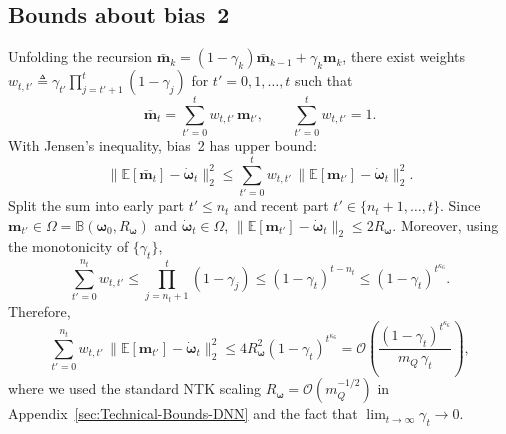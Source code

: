 \documentclass{IEEEtran}
\begin{document}
\subsection{Bounds about bias~2}
Unfolding the recursion $\bar{\boldsymbol{m}}_{k}=(1-\gamma_{k})\bar{\boldsymbol{m}}_{k-1}+\gamma_{k}\boldsymbol{m}_{k}$, there exist weights
$w_{t,t'}\triangleq \gamma_{t'}\prod_{j=t'+1}^{t}(1-\gamma_j)$ for $t'=0,1,\ldots,t$ such that
\begin{equation}
\bar{\boldsymbol{m}}_{t}=\sum_{t'=0}^{t} w_{t,t'}\,\boldsymbol{m}_{t'},\qquad \sum_{t'=0}^{t} w_{t,t'}=1.
\label{eq:appB_bar_m_weights}
\end{equation}
With Jensen's inequality, bias~2 has upper bound: 
\begin{equation}
\bigl\|\mathbb{E}[\bar{\boldsymbol{m}}_{t}]-\dot{\boldsymbol{\omega}}_{t}\bigr\|_2^2
\le \sum_{t'=0}^{t} w_{t,t'}\,\bigl\|\mathbb{E}[\boldsymbol{m}_{t'}]-\dot{\boldsymbol{\omega}}_{t}\bigr\|_2^2.
\label{eq:appB_jensen_bias2}
\end{equation}
Split the sum into early part $t'\le n_t$ and recent part $t'\in\{n_t+1,\ldots,t\}$. Since $\boldsymbol{m}_{t'}\in\Omega=\mathbb{B}(\boldsymbol{\omega}_0,R_{\boldsymbol{\omega}})$ and $\dot{\boldsymbol{\omega}}_{t}\in\Omega$,
$\|\mathbb{E}[\boldsymbol{m}_{t'}]-\dot{\boldsymbol{\omega}}_{t}\|_2\le 2R_{\boldsymbol{\omega}}$. Moreover, using the monotonicity of $\{\gamma_t\}$,
\begin{equation}
\sum_{t'=0}^{n_t} w_{t,t'}
\le \prod_{j=n_t+1}^{t}(1-\gamma_j)
\le (1-\gamma_t)^{t-n_t}
\le (1-\gamma_t)^{t^{\kappa_6}}.
\label{eq:appB_weight_early}
\end{equation}
Therefore,
\begin{equation}
\sum_{t'=0}^{n_t} w_{t,t'}\,\bigl\|\mathbb{E}[\boldsymbol{m}_{t'}]-\dot{\boldsymbol{\omega}}_{t}\bigr\|_2^2
\le 4R_{\boldsymbol{\omega}}^{2}(1-\gamma_t)^{t^{\kappa_6}}
=\mathcal{O}\!\left(\frac{(1-\gamma_t)^{t^{\kappa_6}}}{m_Q\,\gamma_t}\right),
\label{eq:appB_bias2_early}
\end{equation}
where we used the standard NTK scaling $R_{\boldsymbol{\omega}}=\mathcal{O}(m_Q^{-1/2})$ in Appendix~\ref{sec:Technical-Bounds-DNN} and the fact that $\lim_{t\to\infty}\gamma_t\to 0$.
\end{document}
